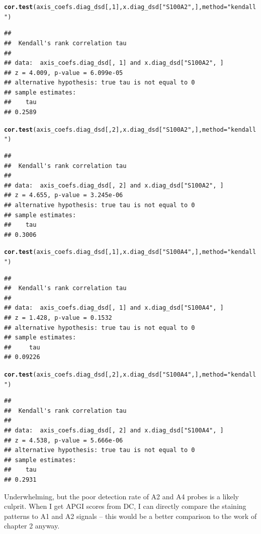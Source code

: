 \documentclass{article}\usepackage[]{graphicx}\usepackage[]{color}
\makeatletter
\newcommand{\hlnum}[1]{\textcolor[rgb]{0.686,0.059,0.569}{#1}}%
\newcommand{\hlstr}[1]{\textcolor[rgb]{0.192,0.494,0.8}{#1}}%
\newcommand{\hlstd}[1]{\textcolor[rgb]{0.345,0.345,0.345}{#1}}%
\newcommand{\hlkwc}[1]{\textcolor[rgb]{0.333,0.667,0.333}{#1}}%
\newcommand{\hlkwd}[1]{\textcolor[rgb]{0.737,0.353,0.396}{\textbf{#1}}}%
\newenvironment{kframe}{%
 \def\at@end@of@kframe{}%
 \ifinner\ifhmode%
  \def\at@end@of@kframe{\end{minipage}}%
  \begin{minipage}{\columnwidth}%
 \fi\fi%
 \def\FrameCommand##1{\hskip\@totalleftmargin \hskip-\fboxsep
 \colorbox{shadecolor}{##1}\hskip-\fboxsep
     \hskip-\linewidth \hskip-\@totalleftmargin \hskip\columnwidth}%
 \MakeFramed {\advance\hsize-\width
   \@totalleftmargin\z@ \linewidth\hsize
   \@setminipage}}%
 {\par\unskip\endMakeFramed%
 \at@end@of@kframe}
\newenvironment{knitrout}{}{} %
\makeatother
\begin{document}
\begin{knitrout}
\begin{kframe}\begin{alltt}
\hlkwd{cor.test}\hlstd{(axis_coefs.diag_dsd[,}\hlnum{1}\hlstd{], x.diag_dsd[}\hlstr{"S100A2"}\hlstd{,],} \hlkwc{method} \hlstd{=} \hlstr{"kendall"}\hlstd{)}
\end{alltt}
\begin{verbatim}
## 
## 	Kendall's rank correlation tau
## 
## data:  axis_coefs.diag_dsd[, 1] and x.diag_dsd["S100A2", ]
## z = 4.009, p-value = 6.099e-05
## alternative hypothesis: true tau is not equal to 0
## sample estimates:
##    tau 
## 0.2589
\end{verbatim}
\begin{alltt}
\hlkwd{cor.test}\hlstd{(axis_coefs.diag_dsd[,}\hlnum{2}\hlstd{], x.diag_dsd[}\hlstr{"S100A2"}\hlstd{,],} \hlkwc{method} \hlstd{=} \hlstr{"kendall"}\hlstd{)}
\end{alltt}
\begin{verbatim}
## 
## 	Kendall's rank correlation tau
## 
## data:  axis_coefs.diag_dsd[, 2] and x.diag_dsd["S100A2", ]
## z = 4.655, p-value = 3.245e-06
## alternative hypothesis: true tau is not equal to 0
## sample estimates:
##    tau 
## 0.3006
\end{verbatim}
\begin{alltt}
\hlkwd{cor.test}\hlstd{(axis_coefs.diag_dsd[,}\hlnum{1}\hlstd{], x.diag_dsd[}\hlstr{"S100A4"}\hlstd{,],} \hlkwc{method} \hlstd{=} \hlstr{"kendall"}\hlstd{)}
\end{alltt}
\begin{verbatim}
## 
## 	Kendall's rank correlation tau
## 
## data:  axis_coefs.diag_dsd[, 1] and x.diag_dsd["S100A4", ]
## z = 1.428, p-value = 0.1532
## alternative hypothesis: true tau is not equal to 0
## sample estimates:
##     tau 
## 0.09226
\end{verbatim}
\begin{alltt}
\hlkwd{cor.test}\hlstd{(axis_coefs.diag_dsd[,}\hlnum{2}\hlstd{], x.diag_dsd[}\hlstr{"S100A4"}\hlstd{,],} \hlkwc{method} \hlstd{=} \hlstr{"kendall"}\hlstd{)}
\end{alltt}
\begin{verbatim}
## 
## 	Kendall's rank correlation tau
## 
## data:  axis_coefs.diag_dsd[, 2] and x.diag_dsd["S100A4", ]
## z = 4.538, p-value = 5.666e-06
## alternative hypothesis: true tau is not equal to 0
## sample estimates:
##    tau 
## 0.2931
\end{verbatim}
\end{kframe}
\end{knitrout}
Underwhelming, but the poor detection rate of A2 and A4 probes is a likely culprit.  When I get APGI scores from DC, I can directly compare the staining patterns to A1 and A2 signals -- this would be a better comparison to the work of chapter 2 anyway.
\end{document}

